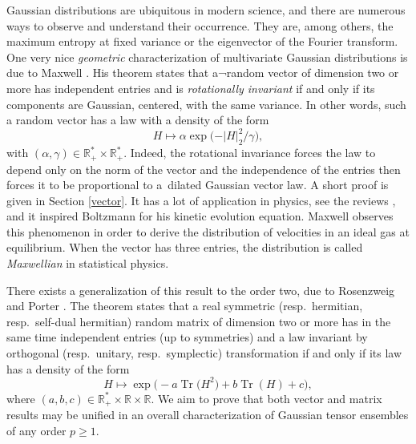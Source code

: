 \documentclass[pdftex]{sigma}
\numberwithin{equation}{section}
\theoremstyle{definition}
\begin{document}
Gaussian distributions are ubiquitous in modern science, and there are numerous ways to observe and understand their occurrence. They are, among others, the maximum entropy at fixed variance or the eigenvector of the Fourier transform. One very nice {\em geometric} characterization of multivariate Gaussian distributions is due to Maxwell \cite{feller,maxwell}. His theorem states that a¬random vector of dimension two or more has independent entries and is {\em rotationally invariant} if and only if its components are Gaussian, centered, with the same variance. In other words, such a random vector has a law with a density of the form
\[ H \mapsto \alpha \exp\bigl(-\vert H \vert_2^2 / \gamma\bigr), \]
with $(\alpha,\gamma) \in \mathbb{R}^*_+ \times \mathbb{R}^*_+$. Indeed, the rotational invariance forces the law to depend only on the norm of the vector and the independence of the entries then forces it to be proportional to a~dilated Gaussian vector law. A short proof is given in Section \ref{vector}. It has a lot of application in physics, see the reviews \cite{Gyenis2017, robson17}, and it inspired Boltzmann for his kinetic evolution equation. Maxwell observes this phenomenon in order to derive the distribution of velocities in an ideal gas at equilibrium. When the vector has three entries, the distribution is called {\em Maxwellian} in statistical physics.

There exists a generalization of this result to the order two, due to Rosenzweig and Porter \cite{rosenzweigporter}.  The theorem states that a real symmetric (resp.\ hermitian, resp.\ self-dual hermitian) random matrix of dimension two or more has in the same time independent entries (up to symmetries) and a law invariant by orthogonal (resp.\ unitary, resp.\ symplectic) transformation if and only if its law has a density of the form
\[ H \mapsto \exp \bigl( - a \operatorname{Tr}\bigl(H^2\bigr) + b \operatorname{Tr}(H) + c \bigr),\]
where $(a,b,c) \in \mathbb{R}^*_+ \times \mathbb{R} \times \mathbb{R}$. We aim to prove that both vector and matrix results may be unified in an overall characterization of Gaussian tensor ensembles of any order $p\geq 1$.
\end{document}
